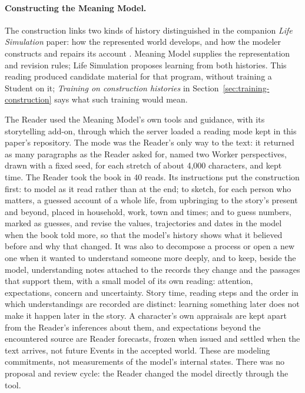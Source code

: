 \documentclass[11pt]{article}
\begin{document}
\paragraph{Constructing the Meaning Model.}
The construction links two kinds of history distinguished in the companion
\emph{Life Simulation} paper: how the represented world develops, and how the
modeler constructs and repairs its account \cite{westerbergLifeSimulation2026}.
Meaning Model supplies the representation and revision rules; Life Simulation
proposes learning from both histories. This reading produced candidate material
for that program, without training a Student on it; \emph{Training on
construction histories} in Section~\ref{sec:training-construction} says what such
training would mean.

The Reader used the Meaning Model's own tools and guidance, with its
storytelling add-on, through which the server loaded a
reading mode kept in this paper's repository. The mode was the Reader's only way
to the text: it returned as many paragraphs as the Reader asked for, named two
Worker perspectives, drawn with a fixed seed, for each stretch of about 4,000
characters, and kept time. The Reader took the book in 40 reads. Its
instructions put the construction first: to model as it read rather than at the
end; to sketch, for each person who matters, a guessed account of a whole life,
from upbringing to the story's present and beyond, placed in household, work,
town and times; and to guess numbers, marked as guesses, and revise the values,
trajectories and dates in the model when the book told more, so that the model's
history shows what it believed before and why that changed. It was also to
decompose a
process or open a new one when it wanted to understand someone more deeply, and
to keep, beside the model, understanding notes attached to the records they
change and the passages that support them, with a small model of its own
reading: attention, expectations, concern and uncertainty. Story time, reading
steps and the order in which understandings are recorded are distinct: learning
something later does not make it happen later in the story. A character's own
appraisals are kept apart from the Reader's inferences about them, and
expectations beyond the encountered source are Reader forecasts, frozen when
issued and settled when the text arrives, not future Events in the accepted
world. These are modeling commitments, not measurements of the model's internal
states. There was no proposal and review cycle: the Reader changed the model
directly through the tool.
\end{document}
